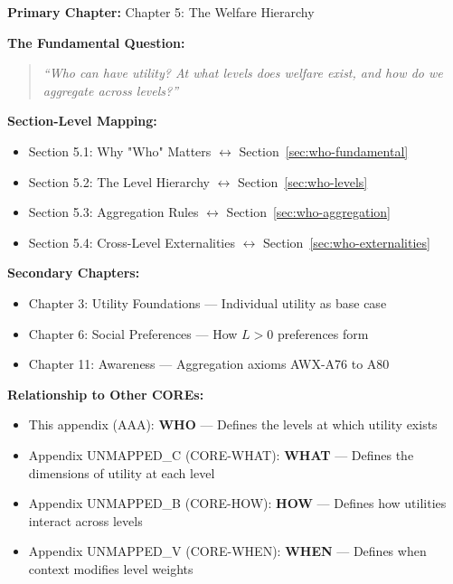 \begin{tcolorbox}[colback=purple!5!white, colframe=purple!75!black,
    title=Chapter Linkage]

\textbf{Primary Chapter:} Chapter 5: The Welfare Hierarchy

\vspace{0.3em}
\textbf{The Fundamental Question:}
\begin{quote}
\textit{``Who can have utility? At what levels does welfare exist, and how do we aggregate across levels?''}
\end{quote}

\textbf{Section-Level Mapping:}
\begin{itemize}[nosep]
\item Section 5.1: Why "Who" Matters $\leftrightarrow$ Section~\ref{sec:who-fundamental}
\item Section 5.2: The Level Hierarchy $\leftrightarrow$ Section~\ref{sec:who-levels}
\item Section 5.3: Aggregation Rules $\leftrightarrow$ Section~\ref{sec:who-aggregation}
\item Section 5.4: Cross-Level Externalities $\leftrightarrow$ Section~\ref{sec:who-externalities}
\end{itemize}

\textbf{Secondary Chapters:}
\begin{itemize}[nosep]
\item Chapter 3: Utility Foundations --- Individual utility as base case
\item Chapter 6: Social Preferences --- How $L > 0$ preferences form
\item Chapter 11: Awareness --- Aggregation axioms AWX-A76 to A80
\end{itemize}

\textbf{Relationship to Other COREs:}
\begin{itemize}[nosep]
\item This appendix (AAA): \textbf{WHO} --- Defines the levels at which utility exists
\item Appendix UNMAPPED_C (CORE-WHAT): \textbf{WHAT} --- Defines the dimensions of utility at each level
\item Appendix UNMAPPED_B (CORE-HOW): \textbf{HOW} --- Defines how utilities interact across levels
\item Appendix UNMAPPED_V (CORE-WHEN): \textbf{WHEN} --- Defines when context modifies level weights
\end{itemize}

\end{tcolorbox}

